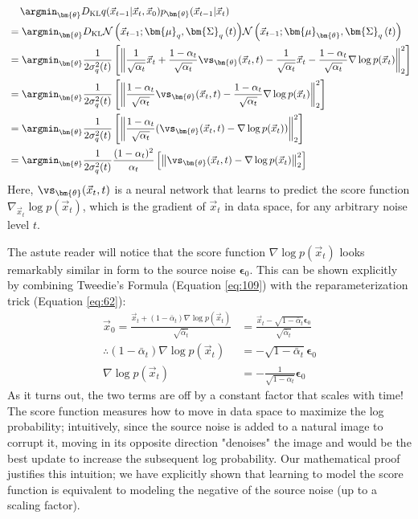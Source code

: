 \begin{align}
& \quad \,\argmin_{\bm{\theta}} D_{\rm{KL}}{q(\vec{x}_{t-1}|\vec{x}_t, \vec{x}_0)}{p_{\bm{\theta}}(\vec{x}_{t-1}|\vec{x}_t)} \nonumber \\
&= \argmin_{\bm{\theta}}D_{\rm{KL}}{\mathcal{N}\left(\vec{x}_{t-1}; \bm{\mu}_q,\bm{\Sigma}_q\left(t\right)\right)}{\mathcal{N}\left(\vec{x}_{t-1}; \bm{\mu}_{\bm{\theta}},\bm{\Sigma}_q\left(t\right)\right)}\\
&=\argmin_{\bm{\theta}}\frac{1}{2\sigma_q^2(t)}\left[\left\lVert\frac{1}{\sqrt{\alpha_t}}\vec{x}_t + \frac{1 - \alpha_t}{\sqrt{\alpha_t}}\vs_{\bm{\theta}}(\vec{x}_t, t) - 
\frac{1}{\sqrt{\alpha_t}}\vec{x}_t - \frac{1 - \alpha_t}{\sqrt{\alpha_t}}\nabla\log p(\vec{x}_t)\right\rVert_2^2\right]\\
&=\argmin_{\bm{\theta}}\frac{1}{2\sigma_q^2(t)}\left[\left\lVert \frac{1 - \alpha_t}{\sqrt{\alpha_t}}\vs_{\bm{\theta}}(\vec{x}_t, t) - \frac{1 - \alpha_t}{\sqrt{\alpha_t}}\nabla\log p(\vec{x}_t)\right\rVert_2^2\right]\\
&=\argmin_{\bm{\theta}}\frac{1}{2\sigma_q^2(t)}\left[\left\lVert \frac{1 - \alpha_t}{\sqrt{\alpha_t}}(\vs_{\bm{\theta}}(\vec{x}_t, t) - \nabla\log p(\vec{x}_t))\right\rVert_2^2\right]\\
&=\argmin_{\bm{\theta}}\frac{1}{2\sigma_q^2(t)}\frac{(1 - \alpha_t)^2}{\alpha_t}\left[\left\lVert \vs_{\bm{\theta}}(\vec{x}_t, t) - \nabla\log p(\vec{x}_t)\right\rVert_2^2\right] \label{eq:123}
\end{align}
Here, $\vs_{\bm{\theta}}(\vec{x}_t, t)$ is a neural network that learns to predict the score function $\nabla_{\vec{x}_t}\log p(\vec{x}_t)$, which is the gradient of $\vec{x}_t$ in data space, for any arbitrary noise level $t$.

The astute reader will notice that the score function $\nabla\log p(\vec{x}_t)$ looks remarkably similar in form to the source noise $\bm{\epsilon}_0$.  This can be shown explicitly by combining Tweedie's Formula (Equation \ref{eq:109}) with the reparameterization trick (Equation \ref{eq:62}):
\begin{align}
\vec{x}_0 = \frac{\vec{x}_t + (1 - \bar\alpha_t)\nabla\log p(\vec{x}_t)}{\sqrt{\bar\alpha_t}} &= \frac{\vec{x}_t - \sqrt{1 - \bar\alpha_t}\bm{\epsilon}_0}{\sqrt{\bar\alpha_t}}\\
\therefore (1 - \bar\alpha_t)\nabla\log p(\vec{x}_t) &= -\sqrt{1 - \bar\alpha_t}\bm{\epsilon}_0\\
\nabla\log p(\vec{x}_t) &= -\frac{1}{\sqrt{1 - \bar\alpha_t}}\bm{\epsilon}_0
\end{align}
As it turns out, the two terms are off by a constant factor that scales with time!  The score function measures how to move in data space to maximize the log probability; intuitively, since the source noise is added to a natural image to corrupt it, moving in its opposite direction "denoises" the image and would be the best update to increase the subsequent log probability.  Our mathematical proof justifies this intuition; we have explicitly shown that learning to model the score function is equivalent to modeling the negative of the source noise (up to a scaling factor).


